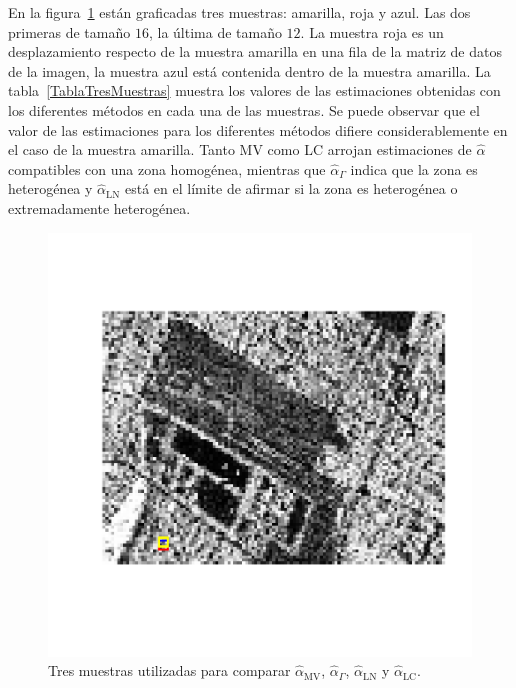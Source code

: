 En la figura~\ref{TresMuestras} están graficadas tres muestras: amarilla, roja y azul. Las dos primeras de tamaño $16$, la última de tamaño $12$. La muestra roja es un desplazamiento respecto de la muestra amarilla en una fila de la matriz de datos de la imagen, la muestra azul está contenida dentro de la muestra amarilla. La tabla~\ref{TablaTresMuestras} muestra los valores de las estimaciones obtenidas con los diferentes métodos en cada una de las muestras. Se puede observar que el valor de las estimaciones para los diferentes métodos difiere considerablemente en el caso de la muestra amarilla. Tanto MV como LC arrojan estimaciones de $\widehat{\alpha}$ compatibles con una zona homogénea, mientras que $\widehat{\alpha}_{\Gamma}$ indica que la zona es heterogénea y $\widehat{\alpha}_{\text{LN}}$ está en el límite de afirmar si la zona es heterogénea o extremadamente heterogénea.
\begin{figure}[htb]
	\centering
	\includegraphics[width=0.8\linewidth]{../../Figures/Tesis/ImagenReal/TresMuestras.pdf}
	\caption{\label{TresMuestras}\small Tres muestras utilizadas para comparar  $\widehat{\alpha}_{\text{MV}}$, $\widehat{\alpha}_{\Gamma}$, $\widehat{\alpha}_{\text{LN}}$ y  $\widehat{\alpha}_{\text{LC}}$.}
\end{figure}

